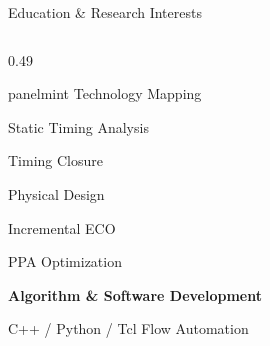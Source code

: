 \documentclass[aspectratio=169,10pt]{beamer}
\begin{document}
\begin{frame}[label=summary-2]{Education \& Research Interests}
\begin{columns}[T,onlytextwidth]
\begin{column}{0.49\textwidth}
\begin{beamercolorbox}[rounded=true,sep=0.20cm,wd=\linewidth]{panelmint}
        {\normalsize Technology Mapping}\par
        {\normalsize Static Timing Analysis}\par
        {\normalsize Timing Closure}\par
        {\normalsize Physical Design}\par
        {\normalsize Incremental ECO}\par
        {\normalsize PPA Optimization}\par
        \vspace{0.15cm}
        {\normalsize\bfseries Algorithm \& Software Development}\par
        \vspace{0.09cm}
        {\normalsize C++ / Python / Tcl Flow Automation}\par
      \end{beamercolorbox}
    \end{column}
  \end{columns}
  \vfill
\end{frame}
\end{document}
